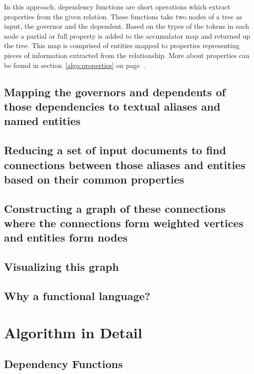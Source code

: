 \documentclass[11pt]{article}
\begin{document}
In this approach, dependency functions are short operations which extract properties from the given relation.  These functions take two nodes of a tree as input, the governor and the dependent.  Based on the types of the tokens in each node a partial or full property is added to the accumulator map and returned up the tree.  This map is comprised of entities mapped to properties representing pieces of information extracted from the relationship.  More about properties can be found in section~\ref{algo:properties} on page~\pageref{algo:properties}.




\subsection{Mapping the governors and dependents of those dependencies to textual aliases and named entities}

\subsection{Reducing a set of input documents to find connections between those aliases and entities based on their common properties}

\subsection{Constructing a graph of these connections where the connections form weighted vertices and entities form nodes}

\subsection{Visualizing this graph}

\subsection{Why a functional language?}

\section{Algorithm in Detail}

\subsection{Dependency Functions}
\end{document}
